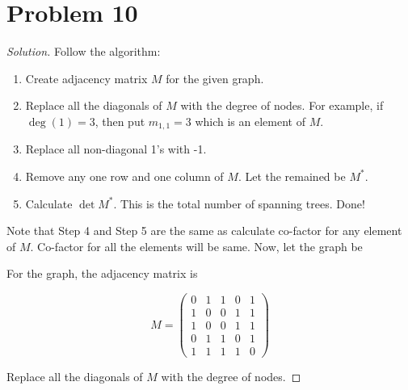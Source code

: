 \section*{Problem 10}
\begin{proof} [Solution]
	Follow the algorithm:
	\begin{enumerate} [Step 1]
		\item Create adjacency matrix $M$ for the given graph. 
		\item Replace all the diagonals of $M$ with the degree of nodes. For example, if $\deg(1)=3$, then put $m_{1,1}=3$ which is an element of $M$.
		\item Replace all non-diagonal 1’s with -1.
		\item Remove any one row and one column of $M$. Let the remained be $M^*$.
		\item Calculate $\det M^*$. This is the total number of spanning trees. Done!
	\end{enumerate}
	Note that Step 4 and Step 5 are the same as calculate co-factor for any element of $M$. Co-factor for all the elements will be same. Now, let the graph be
	\begin{center}
	\end{center}
	For the graph, the adjacency matrix is
	\begin{center}
		\begin{equation*}
			M = \begin{pmatrix} 
				0 & 1 & 1 & 0 & 1 \\
				1 & 0 & 0 & 1 & 1 \\
				1 & 0 & 0 & 1 & 1 \\
				0 & 1 & 1 & 0 & 1 \\
				1 & 1 & 1 & 1 & 0
			\end{pmatrix} 
		\end{equation*}
	\end{center}
	Replace all the diagonals of $M$ with the degree of nodes.

\end{proof}
